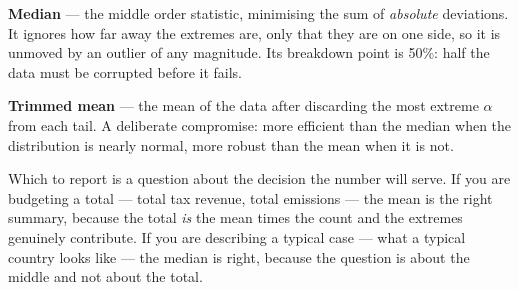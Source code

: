 \documentclass[
  letterpaper,
  10pt,
  twoside,
  openright,
  numbers=noenddot,
  chapterprefix=true]{scrbook}
\begin{document}
\begin{qmibdefinition}

{\textbf{Median}} --- the middle order statistic, minimising the sum of
\emph{absolute} deviations. It ignores how far away the extremes are,
only that they are on one side, so it is unmoved by an outlier of any
magnitude. Its breakdown point is 50\%: half the data must be corrupted
before it fails.

\end{qmibdefinition}

\begin{qmibdefinition}

{\textbf{Trimmed mean}} --- the mean of the data after discarding the
most extreme \(\alpha\) from each tail. A deliberate compromise: more
efficient than the median when the distribution is nearly normal, more
robust than the mean when it is not.

\end{qmibdefinition}

Which to report is a question about the decision the number will serve.
If you are budgeting a total --- total tax revenue, total emissions ---
the mean is the right summary, because the total \emph{is} the mean
times the count and the extremes genuinely contribute. If you are
describing a typical case --- what a typical country looks like --- the
median is right, because the question is about the middle and not about
the total.
\end{document}
